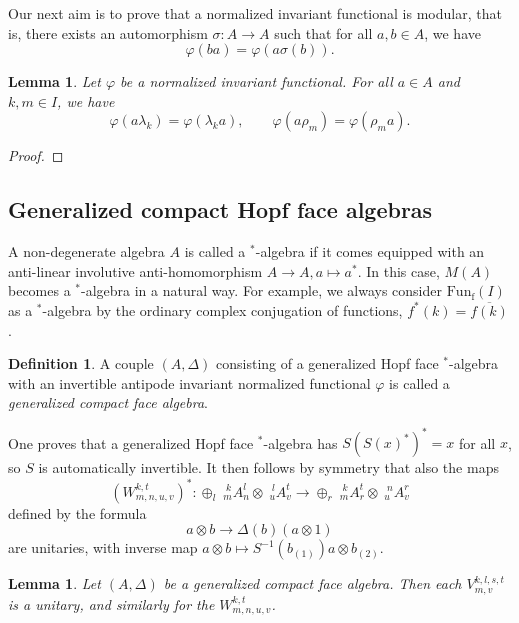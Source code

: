 \documentclass[12pt]{article}
\theoremstyle{change}
\DeclareMathOperator{\fin}{\mathrm{f}}
\newcommand{\Gr}[5]{\;{}^{\;#2}_{#4}#1_{#5}^{#3}}%
\newcommand{\Fun}{\mathrm{Fun}}
\newtheorem{Lem}[Theorem]{Lemma}
\theoremstyle{definition}
\newtheorem{Def}[Theorem]{Definition}
\numberwithin{equation}{section}
\begin{document}
Our next aim is to prove that a normalized invariant functional is modular, that is, there exists an automorphism $\sigma: A\rightarrow A$ such that for all $a,b\in A$, we have \[\varphi(ba) = \varphi(a\sigma(b)).\]

\begin{Lem} Let $\varphi$ be a normalized invariant functional. For all $a\in A$ and $k,m\in I$, we have \[\varphi(a\lambda_k) = \varphi(\lambda_ka),\qquad \varphi(a\rho_m) = \varphi(\rho_ma).\]
\end{Lem}

\begin{proof}

\end{proof}


\subsection{Generalized compact Hopf face algebras}


A non-degenerate algebra $A$ is called a $^*$-algebra if it comes equipped with an anti-linear involutive anti-homomorphism $A\rightarrow A, a\mapsto a^*$. In this case, $M(A)$ becomes a $^*$-algebra in a natural way. For example, we always consider $\Fun_{\fin}(I)$ as a $^*$-algebra by the ordinary complex conjugation of functions, $f^*(k) = \overline{f(k)}$.




\begin{Def} A couple $(A,\Delta)$ consisting of a generalized Hopf face $^*$-algebra with an invertible antipode invariant normalized functional $\varphi$ is called a \emph{generalized compact face algebra}.
\end{Def}

One proves that a generalized Hopf face $^*$-algebra has $S(S(x)^*)^*=x$ for all $x$, so $S$ is automatically invertible. It then follows by symmetry that also the maps \[(W^{k,t}_{m,n,u,v})^*: \oplus_l \Gr{A}{k}{l}{m}{n} \otimes \Gr{A}{l}{t}{u}{v} \rightarrow \oplus_r \Gr{A}{k}{t}{m}{r}\otimes \Gr{A}{n}{r}{u}{v}\] defined by the formula \[a\otimes b\rightarrow \Delta(b)(a\otimes 1)\] are unitaries, with inverse map $a\otimes b\mapsto S^{-1}(b_{(1)})a\otimes b_{(2)}$.

\begin{Lem}\label{LemUni} Let $(A,\Delta)$ be a generalized compact face algebra. Then each $V^{k,l,s,t}_{m,v}$ is a unitary, and similarly for the $W^{k,t}_{m,n,u,v}$.
\end{Lem}
\end{document}
